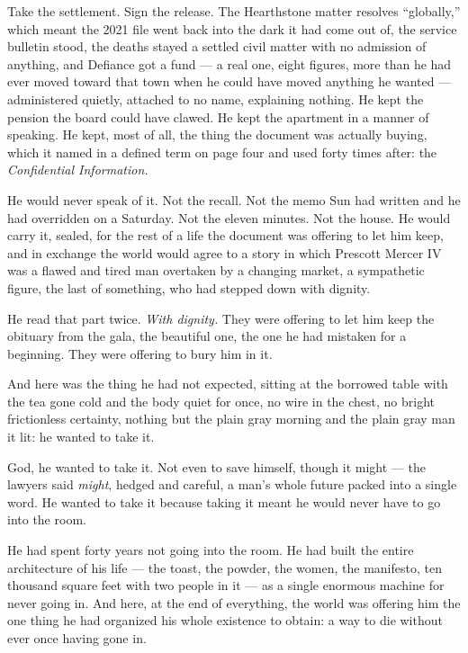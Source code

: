 \documentclass[11pt,openany]{book}
\begin{document}
Take the settlement. Sign the release. The Hearthstone matter resolves ``globally,'' which meant the 2021 file went back into the dark it had come out of, the service bulletin stood, the deaths stayed a settled civil matter with no admission of anything, and Defiance got a fund --- a real one, eight figures, more than he had ever moved toward that town when he could have moved anything he wanted --- administered quietly, attached to no name, explaining nothing. He kept the pension the board could have clawed. He kept the apartment in a manner of speaking. He kept, most of all, the thing the document was actually buying, which it named in a defined term on page four and used forty times after: the \textit{Confidential Information.}

He would never speak of it. Not the recall. Not the memo Sun had written and he had overridden on a Saturday. Not the eleven minutes. Not the house. He would carry it, sealed, for the rest of a life the document was offering to let him keep, and in exchange the world would agree to a story in which Prescott Mercer IV was a flawed and tired man overtaken by a changing market, a sympathetic figure, the last of something, who had stepped down with dignity.

He read that part twice. \textit{With dignity.} They were offering to let him keep the obituary from the gala, the beautiful one, the one he had mistaken for a beginning. They were offering to bury him in it.

And here was the thing he had not expected, sitting at the borrowed table with the tea gone cold and the body quiet for once, no wire in the chest, no bright frictionless certainty, nothing but the plain gray morning and the plain gray man it lit: he wanted to take it.

God, he wanted to take it. Not even to save himself, though it might --- the lawyers said \textit{might}, hedged and careful, a man's whole future packed into a single word. He wanted to take it because taking it meant he would never have to go into the room.

He had spent forty years not going into the room. He had built the entire architecture of his life --- the toast, the powder, the women, the manifesto, ten thousand square feet with two people in it --- as a single enormous machine for never going in. And here, at the end of everything, the world was offering him the one thing he had organized his whole existence to obtain: a way to die without ever once having gone in.
\end{document}
